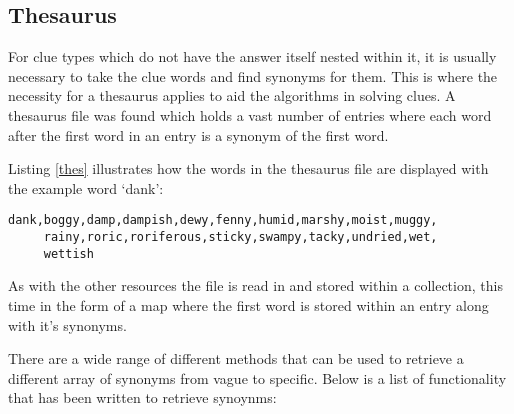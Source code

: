 \subsection{Thesaurus}

For clue types which do not have the answer itself nested within it, it is
usually necessary  to take the clue words and find synonyms for them. This is
where the necessity for a thesaurus  applies to aid the algorithms in solving
clues. A thesaurus file was found which holds a vast number  of entries where
each word after the first word in an entry is a synonym of the first word.

Listing \ref{thes} illustrates how the words in the thesaurus file are displayed
with the example word `dank':

\begin{lstlisting}[caption={A sample of the thesaurus file for the word `dank'},
                   label=thes]  
dank,boggy,damp,dampish,dewy,fenny,humid,marshy,moist,muggy,
     rainy,roric,roriferous,sticky,swampy,tacky,undried,wet,
     wettish
\end{lstlisting}

As with the other resources the file is read in and stored within a collection,
this  time in the form of a map where the first word is stored within an entry
along with it's synonyms.

There are a wide range of different methods that can be used to retrieve a
different array  of synonyms from vague to specific. Below is a list of
functionality that has been written  to retrieve synoynms:

